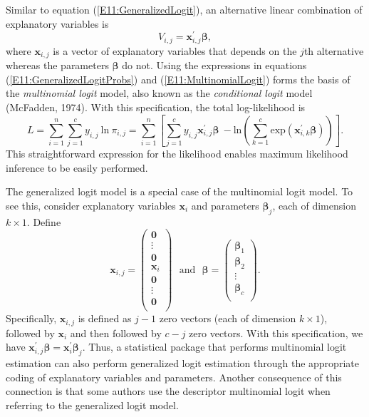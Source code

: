 Similar to equation (\ref{E11:GeneralizedLogit}), an alternative
linear combination of explanatory variables is
\begin{equation}\label{E11:MultinomialLogit}
V_{i,j} = \mathbf{x}_{i,j}^{\prime} \boldsymbol \beta,
\end{equation}
where $\mathbf{x}_{i,j}$ is a vector of explanatory variables that
depends on the $j$th alternative whereas the parameters
$\boldsymbol \beta$ do not. Using the expressions in equations
(\ref{E11:GeneralizedLogitProbs}) and (\ref{E11:MultinomialLogit})
forms the basis of the \emph{multinomial logit} model, also known as
the \emph{conditional logit} model (McFadden, 1974). With this
specification, the total log-likelihood is
\begin{equation*}
L = \sum_{i=1}^n \sum_{j=1}^c y_{i,j}~ \mathrm{ln}~ \pi_{i,j} =
\sum_{i=1}^n \left[ \sum_{j=1}^c y_{i,j} \mathbf{x}_{i,j}^{\prime}
\boldsymbol \beta \ - \mathrm{ln} \left(\sum_{k=1}^c
\mathrm{exp}(\mathbf{x}_{i,k}^{\prime} \boldsymbol \beta)  \right)
\right].
\end{equation*}
This straightforward expression for the likelihood enables maximum
likelihood inference to be easily performed.

The generalized logit model is a special case of the multinomial
logit model. To see this, consider explanatory variables
$\mathbf{x}_i$ and parameters $\boldsymbol \beta_j$, each of
dimension $k\times 1$. Define
\begin{equation*}
\mathbf{x}_{i,j} = \left(
\begin{array}{c}
\mathbf{0} \\ \vdots \\ \mathbf{0} \\ \mathbf{x}_i \\ \mathbf{0} \\
\vdots \\ \mathbf{0} \\
\end{array}\right) ~~~ \mathrm{and}~~~
\boldsymbol \beta = \left(
\begin{array}{c}
\boldsymbol \beta_1 \\ \boldsymbol \beta_2 \\
\vdots \\
\boldsymbol \beta_c \\
\end{array} \right).
\end{equation*}
Specifically, $\mathbf{x}_{i,j}$ is defined as $j-1$ zero vectors
(each of dimension $k\times 1$), followed by $\mathbf{x}_i$  and
then followed by $c-j$ zero vectors. With this specification, we
have $\mathbf{x}_{i,j}^{\prime} \boldsymbol \beta
=\mathbf{x}_i^{\prime} \boldsymbol \beta_j$. Thus, a statistical
package that performs multinomial logit estimation can also perform
generalized logit estimation through the appropriate coding of
explanatory variables and parameters. Another consequence of this
connection is that some authors use the descriptor multinomial logit
when referring to the  generalized logit model.


